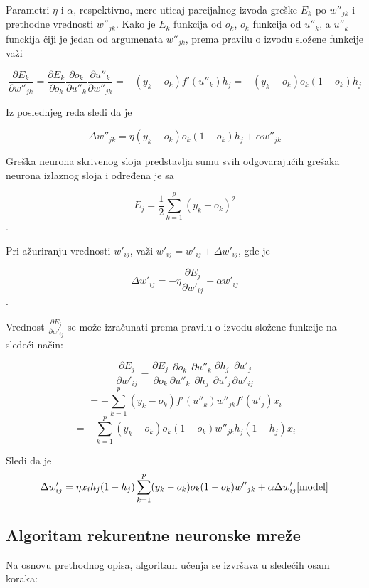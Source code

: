\documentclass[a4paper]{article}
\begin{document}
Parametri $\eta{}$ i $\alpha{}$, respektivno, mere uticaj parcijalnog izvoda greške $E_k$ po $w{''}_{jk}$ i prethodne vrednosti \Delta{}$w{''}_{jk}$. Kako je $E_k$ funkcija od $o_k$, $o_k$ funkcija od $u{''}_k$, a $u{''}_k$ funckija čiji je jedan od argumenata $w{''}_{jk}$, prema pravilu o izvodu složene funkcije važi 

$$\frac{\partial{}E_k}{\partial{}w{''}_{jk}} = \frac{\partial{}E_k}{\partial{}o_{k}}\frac{\partial{}o_k}{\partial{}u{''}_{k}}\frac{\partial{}u{''}_k}{\partial{}w{''}_{jk}} = -(y_k-o_k)f'(u{''}_k)h_j = -(y_k-o_k)o_k(1-o_k)h_j$$

Iz poslednjeg reda sledi da je 

$$\Delta{}w{''}_{jk}=\eta{}(y_k-o_k)o_k(1-o_k)h_j+\alpha{}w{''}_{jk}$$

Greška neurona skrivenog sloja predstavlja sumu svih odgovarajućih grešaka neurona izlaznog sloja i određena je sa

$$E_j = \frac{1}{2}\sum_{k=1}^p(y_k - o_k)^2$$.

Pri ažuriranju vrednosti $w'_{ij}$, važi $w'_{ij}=w'_{ij} + \Delta{}w'_{ij}$, gde je

$$\Delta{}{}w'_{ij} = - \eta{}\frac{\partial{}E_j}{\partial{}w{'}_{ij}}+\alpha{}w'_{ij}$$.

Vrednost $\frac{\partial{}E_j}{\partial{}w'_{ij}}$ se može izračunati prema pravilu o izvodu složene funkcije na sledeći način:

$$\frac{\partial{}E_j}{\partial{}w'_{ij}}=\frac{\partial{}E_j}{\partial{}o_{k}}\frac{\partial{}o_k}{\partial{}u{''}_{k}}\frac{\partial{}u{''}_k}{\partial{}h_{j}}\frac{\partial{}h_j}{\partial{}u'_{j}}\frac{\partial{}u'_j}{\partial{}w'_{ij}}$$
$$ = -\sum_{k=1}^p(y_k-o_k)f'(u{''}_k)w{''}_{jk}f'(u'_j)x_i$$
$$ = -\sum_{k=1}^p(y_k-o_k)o_k(1-o_k)w{''}_{jk}h_j(1-h_j)x_i$$

Sledi da je 
$$\Delta{}w'_{ij}=\eta{}x_ih_j(1-h_j)\sum_{k=1}^p(y_k-o_k)o_k(1-o_k)w{''}_{jk} + \alpha{}\Delta{}w'_{ij}\cite{model}$$

\subsection{Algoritam rekurentne neuronske mreže}
\label{sec:model}

Na osnovu prethodnog opisa, algoritam učenja se izvršava u sledećih osam koraka\cite{model}:
\end{document}

